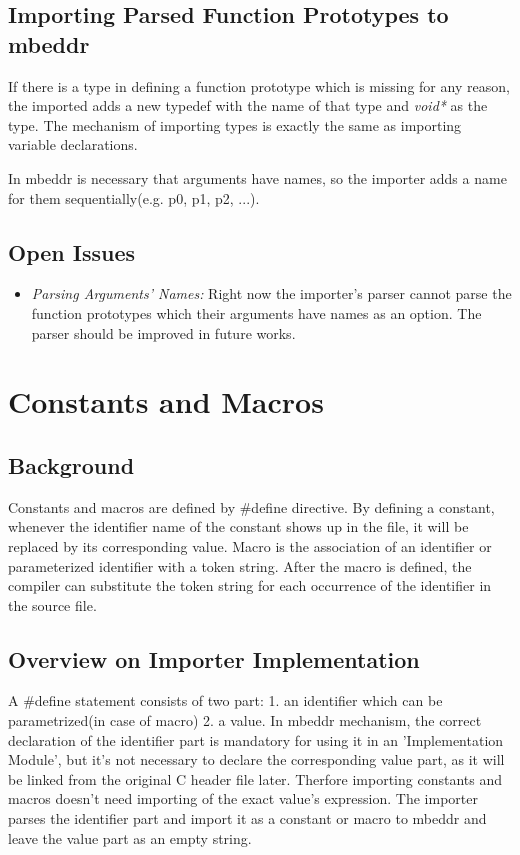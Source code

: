 \documentclass[titlepage]{article}
\begin{document}
\subsection{Importing Parsed Function Prototypes to mbeddr}
If there is a type in defining a function prototype which is missing for any reason, the imported adds  a new typedef with the name of that type and \emph{void*} as the type. The mechanism of importing types is exactly the same as importing variable declarations.

In mbeddr is necessary that arguments have names, so the importer adds a name for them sequentially(e.g. p0, p1, p2, ...).
\subsection{Open Issues}
\begin{itemize}
\item \emph{Parsing Arguments' Names:} Right now the importer's parser cannot parse the function prototypes which their arguments have names as an option. The parser should be improved in future works.
\end{itemize}

\section{Constants and Macros}
\subsection{Background}
Constants and macros are defined by \#define directive. By defining a constant, whenever the identifier name of the constant shows up in the file, it will be replaced by its corresponding value. Macro is the association of an identifier or parameterized identifier with a token string. After the macro is defined, the compiler can substitute the token string for each occurrence of the identifier in the source file.
\subsection{Overview on Importer Implementation}
A \#define statement consists of two part: 1. an identifier which can be parametrized(in case of macro) 2. a value. In mbeddr mechanism, the correct declaration of the identifier part is mandatory for using it in an 'Implementation Module', but it's not necessary to declare the corresponding value part, as it will be linked from the original C header file later. Therfore importing constants and macros doesn't need importing of the exact value's expression. The importer parses the identifier part and import it as a constant or macro to mbeddr and leave the value part as an empty string.
\end{document}
